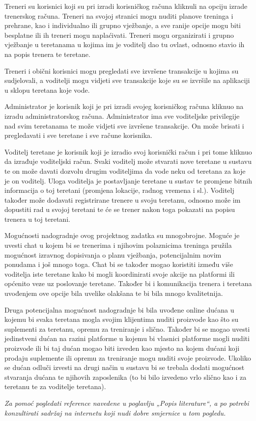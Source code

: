 		Treneri su korisnici koji su pri izradi korisničkog računa kliknuli na opciju izrade trenerskog računa. Treneri na
		svojoj stranici mogu nuditi planove treninga i prehrane, kao i individualno ili grupno vježbanje, a sve ranije
		opcije mogu biti besplatne ili ih treneri mogu naplaćivati. Treneri mogu organizirati i grupno vježbanje u
		teretanama u kojima im je voditelj dao tu ovlast, odnosno stavio ih na popis trenera te teretane.
	
		
		Treneri i obični korisnici mogu pregledati sve izvršene transakcije u kojima su sudjelovali, a voditelji mogu
		vidjeti sve transakcije koje su se izvršile na aplikaciji u sklopu teretana koje vode.
		
		Administrator je korisnik koji je pri izradi svojeg korisničkog računa kliknuo na izradu administratorskog
		računa. Administrator ima sve voditeljske privilegije nad svim teretanama te može vidjeti sve izvršene
		transakcije. On može brisati i pregledavati i sve teretane i sve račune korisnika.
		
		Voditelj teretane je korisnik koji je izradio svoj korisnički račun i pri tome kliknuo da izrađuje voditeljski račun.
		Svaki voditelj može stvarati nove teretane u sustavu te on može davati dozvolu drugim voditeljima da vode
		neku od teretana za koje je on voditelj. Uloga voditelja je postavljanje teretane u sustav te promjene bitnih
		informacija o toj teretani (promjena lokacije, radnog vremena i sl.). Voditelj također može dodavati
		registrirane trenere u svoju teretanu, odnosno može im dopustiti rad u svojoj teretani te će se trener nakon
		toga pokazati na popisu trenera u toj teretani.
		
	
	
		\vspace{5mm}
		
		Mogućnosti nadogradnje ovog projektnog zadatka su mnogobrojne. Moguće je uvesti chat u kojem bi se trenerima i njihovim polaznicima treninga pružila mogućnost izravnog dopisivanja o planu vježbanja, potencijalnim novim ponudama i 
		još mnogo toga. Chat bi se također mogao koristiti između više voditelja iste teretane kako bi mogli koordinirati svoje akcije na platformi ili općenito veze uz poslovanje teretane. Također bi i komunikacija trenera i teretana uvođenjem ove 
		opcije bila uvelike olakšana te bi bila mnogo kvalitetnija. 
		
		Druga potencijalna mogućnost nadogradnje bi bila uvođene online dućana u kojemu 
		bi svaka teretana mogla svojim klijentima nuditi proizvode kao što su suplementi za 
		teretanu, opremu za treniranje i slično. Također bi se mogao uvesti jedinstveni 
		dućan na razini platforme u kojemu bi vlasnici platforme mogli nuditi proizvode ili bi 
		taj dućan mogao biti izveden kao mjesto na kojem dućani koji prodaju suplemente ili 
		opremu za treniranje mogu nuditi svoje proizvode. Ukoliko se dućan odluči izvesti na 
		drugi način u sustavu bi se trebala dodati mogućnost stvaranja dućana te njihovih 
		zaposlenika (to bi bilo izvedeno vrlo slično kao i za teretanu te za voditelje teretana).
		
		
	
		\vspace{5mm}
	
		\textit{Za pomoć pogledati reference navedene u poglavlju „Popis literature“, a po potrebi konzultirati sadržaj na internetu koji nudi dobre smjernice u tom pogledu.}
		\eject
		
		\eject
		
	